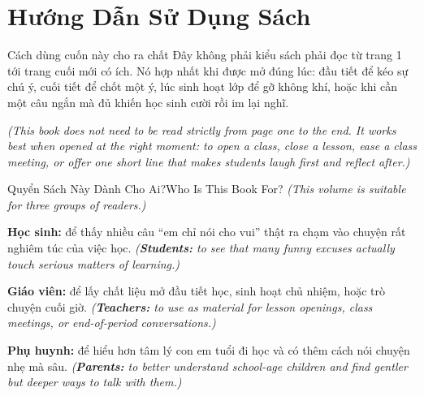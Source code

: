 \chapter*{Hướng Dẫn Sử Dụng Sách}

\begin{quotecard}{Cách dùng cuốn này cho ra chất}
Đây không phải kiểu sách phải đọc từ trang 1 tới trang cuối mới có ích. Nó hợp nhất khi được mở đúng lúc: đầu tiết để kéo sự chú ý, cuối tiết để chốt một ý, lúc sinh hoạt lớp để gỡ không khí, hoặc khi cần một câu ngắn mà đủ khiến học sinh cười rồi im lại nghĩ.

\textit{(This book does not need to be read strictly from page one to the end. It works best when opened at the right moment: to open a class, close a lesson, ease a class meeting, or offer one short line that makes students laugh first and reflect after.)}
\end{quotecard}

\begin{truyen}{Quyển Sách Này Dành Cho Ai?}{Who Is This Book For?}
\textit{(This volume is suitable for three groups of readers.)}

\textbf{Học sinh:} để thấy nhiều câu ``em chỉ nói cho vui'' thật ra chạm vào chuyện rất nghiêm túc của việc học.
\textit{(\textbf{Students:} to see that many funny excuses actually touch serious matters of learning.)}

\textbf{Giáo viên:} để lấy chất liệu mở đầu tiết học, sinh hoạt chủ nhiệm, hoặc trò chuyện cuối giờ.
\textit{(\textbf{Teachers:} to use as material for lesson openings, class meetings, or end-of-period conversations.)}

\textbf{Phụ huynh:} để hiểu hơn tâm lý con em tuổi đi học và có thêm cách nói chuyện nhẹ mà sâu.
\textit{(\textbf{Parents:} to better understand school-age children and find gentler but deeper ways to talk with them.)}
\end{truyen}

\vspace{6pt}

